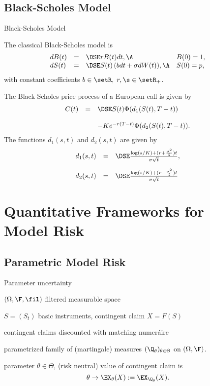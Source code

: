 \subsection{Black-Scholes Model}

{ Black-Scholes Model}

The classical Black-Scholes model is
$$
\begin{array}{llll}
dB(t) &=&\DSE r B(t) dt, \A &B(0)= 1,\\ dS(t) &=&\DSE S(t) \left(
b dt + \sigma dW(t) \right)\!, \A &S(0) = p,
\end{array}
$$
with constant coefficients $b \in \setR,\; r,\s \in \setR_+$.

The Black-Scholes price pro\-cess of a European call is given by
$$
\begin{array}{lll}
C(t) &=&\DSE S(t) \Phi(d_1(S(t), T-t))\\*[12pt] &&- K e^{-r(T-t)}
\Phi(d_2(S(t), T-t)).
\end{array}
$$
The functions $d_1(s,t)$ and $d_2(s,t)$ are given by
$$
\begin{array}{lll}
d_1(s,t) &=&\DSE \frac{\log(s/K) + (r +
\frac{\sigma^2}{2})t}{\sigma \sqrt{t}},\\*[12pt] d_2(s,t) &=&\DSE
 \frac{\log(s/K) + (r -
\frac{\sigma^2}{2})t}{\sigma \sqrt{t}}
\end{array}
$$

\section{Quantitative Frameworks for Model Risk}
\subsection{Parametric Model Risk}

{Parameter uncertainty}






	$(\Omega, \F, \fil)$ filtered measurable space

	$S= (S_t)$ basic instruments, contingent claim $X=F(S)$
%

	contingent claims discounted with matching numer{\'a}ire

	parametrized family of (martingale) measures $(\Q_\theta)_{\theta \in \Theta}$ on $(\Omega, \F)$.

	parameter $\theta \in \Theta$, (risk neutral) value of contingent claim is
$$
\theta \rightarrow \EX_\theta(X) := \EX_{\Q_\theta}(X).
$$



